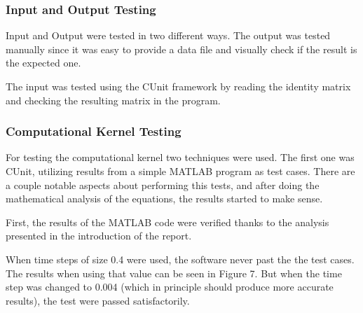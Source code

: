 \documentclass[12pt,a4paper]{article}
\begin{document}



\subsubsection{Input and Output Testing}

Input and Output were tested in two different ways. The output was tested manually since it was easy to provide a data file and visually check if the result is the expected one. 

The input was tested using the CUnit framework by reading the identity matrix and checking the resulting matrix in the program. 



\subsubsection{Computational Kernel Testing}


For testing the computational kernel two techniques were used. The first one was CUnit, utilizing results from a simple MATLAB program as test cases. There are a couple notable aspects about performing this tests, and after doing the mathematical analysis of the equations, the results started to make sense. 

First, the results of the MATLAB code were verified thanks to the analysis presented in the introduction of the report.

When time steps of size 0.4 were used, the software never past the the test cases. The results when using that value can be seen in Figure 7. But when the time step was changed to 0.004 (which in principle should produce more accurate results), the test were passed satisfactorily. 


\end{document}
